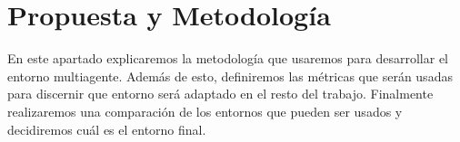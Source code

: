 \chapter{Propuesta y Metodología}
\label{section:Propuesta y Metodología}
En este apartado explicaremos la metodología que usaremos para desarrollar el entorno multiagente. Además de esto, definiremos las métricas que serán usadas para discernir que entorno será adaptado en el resto del trabajo. Finalmente realizaremos una comparación de los entornos que pueden ser usados y decidiremos cuál es el entorno final.



